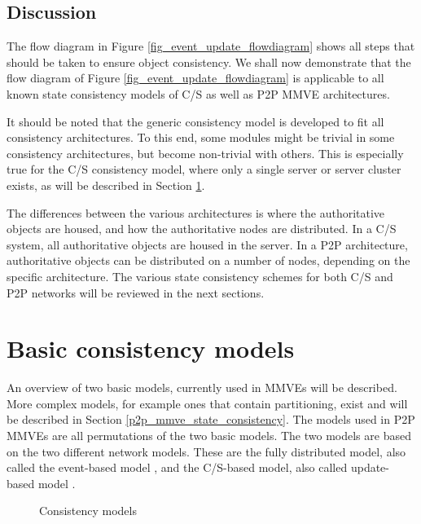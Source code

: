 \subsection{Discussion}

The flow diagram in Figure \ref{fig_event_update_flowdiagram} shows all steps that should be taken to ensure object consistency. We shall now demonstrate that the flow diagram of Figure \ref{fig_event_update_flowdiagram} is applicable to all known state consistency models of C/S as well as P2P MMVE architectures.

It should be noted that the generic consistency model is developed to fit all consistency architectures. To this end, some modules might be trivial in some consistency architectures, but become non-trivial with others. This is especially true for the C/S consistency model, where only a single server or server cluster exists, as will be described in Section \ref{classic_models}.

The differences between  the various architectures is where the authoritative objects are  housed, and how the authoritative nodes are distributed. In a C/S system, all authoritative objects are housed in the server. In a P2P architecture, authoritative objects can be distributed on a number of nodes, depending on the specific architecture. The various state consistency schemes for both C/S and P2P networks will be reviewed in the next sections.

\section{Basic consistency models}
\label{classic_models}

An overview of two basic models, currently used in MMVEs will be described. More complex models, for example ones that contain partitioning, exist and will be described in Section \ref{p2p_mmve_state_consistency}. The models used in P2P MMVEs are all permutations of the two basic models. The two models are based on the two different network models. These are the fully distributed model, also called the event-based model \cite{p2p_cm_aoe}, and the C/S-based model, also called update-based model \cite{unreal_networking}.

\begin{figure}[htbp]
\centering {}
\caption{Consistency models}
\end{figure}

